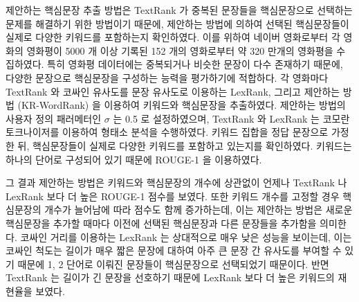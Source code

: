 \documentclass[oneside, ko,phd]{snuthesis_utf8_kor}
\begin{document}
제안하는 핵심문장 추출 방법은 TextRank 가 중복된 문장들을 핵심문장으로 선택하는 문제를 해결하기 위한 방법이기 때문에, 제안하는 방법에 의하여 선택된 핵심문장들이 실제로 다양한 키워드를 포함하는지 확인하였다.
이를 위하여 네이버 영화로부터 각 영화의 영화평이 5000 개 이상 기록된 152 개의 영화로부터 약 320 만개의 영화평을 수집하였다.
특히 영화평 데이터에는 중복되거나 비슷한 문장이 다수 존재하기 때문에, 다양한 문장으로 핵심문장을 구성하는 능력을 평가하기에 적합하다.
각 영화마다 TextRank 와 코싸인 유사도를 문장 유사도로 이용하는 LexRank, 그리고 제안하는 방법 (KR-WordRank) 을 이용하여 키워드와 핵심문장을 추출하였다.
제안하는 방법의 사용자 정의 패러메터인 $\sigma$ 는 0.5 로 설정하였으며, TextRank 와 LexRank 는 코모란 토크나이저를 이용하여 형태소 분석을 수행하였다.
키워드 집합을 정답 문장으로 가정한 뒤, 핵심문장들이 실제로 다양한 키워드를 포함하고 있는지를 확인하였다.
키워드는 하나의 단어로 구성되어 있기 때문에 ROUGE-1 을 이용하였다.

그 결과 제안하는 방법은 키워드와 핵심문장의 개수에 상관없이 언제나 TextRank 나 LexRank 보다 더 높은 ROUGE-1 점수를 보였다.
또한 키워드 개수를 고정할 경우 핵심문장의 개수가 늘어남에 따라 점수도 함께 증가하는데, 이는 제안하는 방법은 새로운 핵심문장을 추가할 때마다 이전에 선택된 핵심문장과 다른 문장들을 추가함을 의미한다.
코싸인 거리를 이용하는 LexRank 는 상대적으로 매우 낮은 성능을 보이는데, 이는 코싸인 척도는 길이가 매우 짧은 문장에 대하여 아주 큰 문장 간 유사도를 부여할 수 있기 때문에 1, 2 단어로 이뤄진 문장들이 핵심문장으로 선택되었기 때문이다.
반면 TextRank 는 길이가 긴 문장을 선호하기 때문에 LexRank 보다 더 높은 키워드의 재현율을 보였다.
\end{document}
